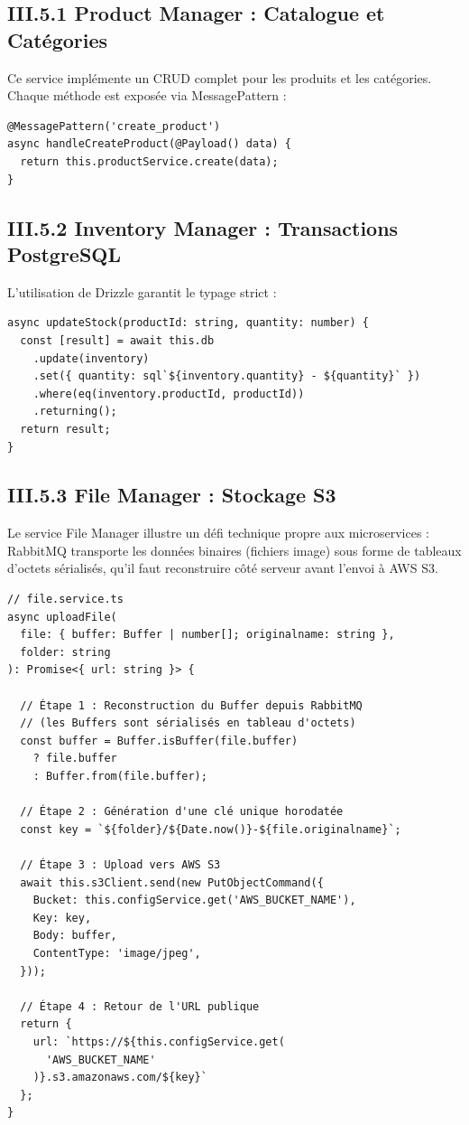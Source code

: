 \label{sec:microservices_impl}

\subsection{III.5.1 Product Manager : Catalogue et Catégories}
Ce service implémente un CRUD complet pour les produits et les catégories. Chaque méthode est exposée via MessagePattern :

\begin{verbatim}
@MessagePattern('create_product')
async handleCreateProduct(@Payload() data) {
  return this.productService.create(data);
}
\end{verbatim}

\subsection{III.5.2 Inventory Manager : Transactions PostgreSQL}
L'utilisation de Drizzle garantit le typage strict :

\begin{verbatim}
async updateStock(productId: string, quantity: number) {
  const [result] = await this.db
    .update(inventory)
    .set({ quantity: sql`${inventory.quantity} - ${quantity}` })
    .where(eq(inventory.productId, productId))
    .returning();
  return result;
}
\end{verbatim}

\subsection{III.5.3 File Manager : Stockage S3}
Le service File Manager illustre un défi technique propre aux microservices : RabbitMQ transporte les données binaires (fichiers image) sous forme de tableaux d'octets sérialisés, qu'il faut reconstruire côté serveur avant l'envoi à AWS S3.

\begin{verbatim}
// file.service.ts
async uploadFile(
  file: { buffer: Buffer | number[]; originalname: string },
  folder: string
): Promise<{ url: string }> {

  // Étape 1 : Reconstruction du Buffer depuis RabbitMQ
  // (les Buffers sont sérialisés en tableau d'octets)
  const buffer = Buffer.isBuffer(file.buffer)
    ? file.buffer
    : Buffer.from(file.buffer);

  // Étape 2 : Génération d'une clé unique horodatée
  const key = `${folder}/${Date.now()}-${file.originalname}`;

  // Étape 3 : Upload vers AWS S3
  await this.s3Client.send(new PutObjectCommand({
    Bucket: this.configService.get('AWS_BUCKET_NAME'),
    Key: key,
    Body: buffer,
    ContentType: 'image/jpeg',
  }));

  // Étape 4 : Retour de l'URL publique
  return {
    url: `https://${this.configService.get(
      'AWS_BUCKET_NAME'
    )}.s3.amazonaws.com/${key}`
  };
}
\end{verbatim}


